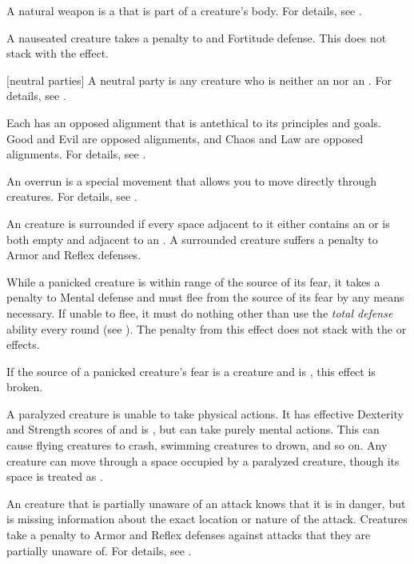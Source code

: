  A natural weapon is a  that is part of a creature's body.
For details, see .

 A nauseated creature takes a  penalty to  and Fortitude defense.
This does not stack with the  effect.

[neutral parties] A neutral party is any creature who is neither an  nor an .
For details, see .

 Each  has an opposed alignment that is antethical to its principles and goals.
Good and Evil are opposed alignments, and Chaos and Law are opposed alignments.
For details, see .

 An overrun is a special movement that allows you to move directly through creatures.
For details, see .

 An creature is surrounded if every space adjacent to it either contains an  or is both empty and adjacent to an .
A surrounded creature suffers a  penalty to Armor and Reflex defenses.

 While a panicked creature is within \rngmed range of the source of its fear, it takes a  penalty to Mental defense and must flee from the source of its fear by any means necessary.
If unable to flee, it must do nothing other than use the \textit{total defense} ability every round (see ).
The penalty from this effect does not stack with the  or  effects.

If the source of a panicked creature's fear is a creature and is , this effect is broken.

 A paralyzed creature is unable to take physical actions. It has effective Dexterity and Strength scores of  and is \helpless, but can take purely mental actions. This can cause flying creatures to crash, swimming creatures to drown, and so on. Any creature can move through a space occupied by a paralyzed creature, though its space is treated as .

 An creature that is partially unaware of an attack knows that it is in danger, but is missing information about the exact location or nature of the attack.
Creatures take a  penalty to Armor and Reflex defenses against attacks that they are partially unaware of.
For details, see .

